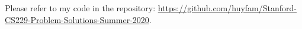 \begin{answer}
Please refer to my code in the repository: \url{https://github.com/huyfam/Stanford-CS229-Problem-Solutions-Summer-2020}. \\
\end{answer}
